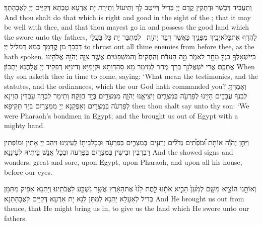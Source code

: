 {וְתַעֲבֵיד דְּכָשַׁר וּדְתָקֵין קֳדָם יְיָ בְּדִיל דְּיִיטַב לָךְ וְתֵיעוֹל וְתֵירַת יָת אַרְעָא טָבְתָא דְּקַיֵּים יְיָ לַאֲבָהָתָךְ׃}
{And thou shalt do that which is right and good in the sight of the \lord; that it may be well with thee, and that thou mayest go in and possess the good land which the \lord\space swore unto thy fathers,}{}
{לַהֲדֹ֥ף אֶת\maqqaf כׇּל\maqqaf אֹיְבֶ֖יךָ מִפָּנֶ֑יךָ כַּאֲשֶׁ֖ר דִּבֶּ֥ר יְהֹוָֽה׃ \setuma }
{לְמִתְבַּר יָת כָּל בַּעֲלֵי דְּבָבָךְ מִן קֳדָמָךְ כְּמָא דְּמַלֵּיל יְיָ׃}
{to thrust out all thine enemies from before thee, as the \lord\space hath spoken.}{}
{כִּֽי\maqqaf יִשְׁאׇלְךָ֥ בִנְךָ֛ מָחָ֖ר לֵאמֹ֑ר מָ֣ה הָעֵדֹ֗ת וְהַֽחֻקִּים֙ וְהַמִּשְׁפָּטִ֔ים אֲשֶׁ֥ר צִוָּ֛ה יְהֹוָ֥ה אֱלֹהֵ֖ינוּ אֶתְכֶֽם׃}
{אֲרֵי יִשְׁאֲלִנָּךְ בְּרָךְ מְחַר לְמֵימַר מָא סָהִדְוָתָא וּקְיָמַיָּא וְדִינַיָּא דְּפַקֵּיד יְיָ אֱלָהֲנָא יָתְכוֹן׃}
{When thy son asketh thee in time to come, saying: ‘What mean the testimonies, and the statutes, and the ordinances, which the \lord\space our God hath commanded you?}{}
{וְאָמַרְתָּ֣ לְבִנְךָ֔ עֲבָדִ֛ים הָיִ֥ינוּ לְפַרְעֹ֖ה בְּמִצְרָ֑יִם וַיֹּצִיאֵ֧נוּ יְהֹוָ֛ה מִמִּצְרַ֖יִם בְּיָ֥ד חֲזָקָֽה׃}
{וְתֵימַר לִבְרָךְ עַבְדִּין הֲוֵינָא לְפַרְעֹה בְּמִצְרָיִם וְאַפְּקַנָא יְיָ מִמִּצְרַיִם בְּיַד תַּקִּיפָא׃}
{then thou shalt say unto thy son: ‘We were Pharaoh’s bondmen in Egypt; and the \lord\space brought us out of Egypt with a mighty hand.}{}

{וַיִּתֵּ֣ן יְהֹוָ֡ה אוֹתֹ֣ת וּ֠מֹפְתִ֠ים גְּדֹלִ֨ים וְרָעִ֧ים \pasek  בְּמִצְרַ֛יִם בְּפַרְעֹ֥ה וּבְכׇל\maqqaf בֵּית֖וֹ לְעֵינֵֽינוּ׃}
{וִיהַב יְיָ אָתִין וּמוֹפְתִין רַבְרְבִין וּבִישִׁין בְּמִצְרַיִם בְּפַרְעֹה וּבְכָל אֱנָשׁ בֵּיתֵיהּ לְעֵינַנָא׃}
{And the \lord\space showed signs and wonders, great and sore, upon Egypt, upon Pharaoh, and upon all his house, before our eyes.}{}

{וְאוֹתָ֖נוּ הוֹצִ֣יא מִשָּׁ֑ם לְמַ֙עַן֙ הָבִ֣יא אֹתָ֔נוּ לָ֤תֶת לָ֙נוּ֙ אֶת\maqqaf הָאָ֔רֶץ אֲשֶׁ֥ר נִשְׁבַּ֖ע לַאֲבֹתֵֽינוּ׃}
{וְיָתַנָא אַפֵּיק מִתַּמָּן בְּדִיל לְאַעָלָא יָתַנָא לְמִתַּן לַנָא יָת אַרְעָא דְּקַיֵּים לַאֲבָהָתַנָא׃}
{And He brought us out from thence, that He might bring us in, to give us the land which He swore unto our fathers.}{}

